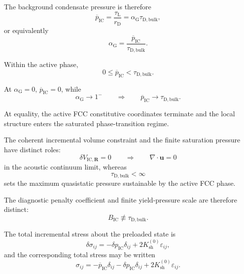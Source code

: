 The background condensate pressure is therefore
\begin{equation}
    \overline{p}_{\mathrm{IC}}
    =
    \frac{\tau_{\mathrm{L}}}{r_{\mathrm{D}}}
    =
    \alpha_{\mathrm{G}}
    \tau_{\mathrm{D,bulk}},
\end{equation}
or equivalently
\begin{equation}
    \alpha_{\mathrm{G}}
    =
    \frac{\overline{p}_{\mathrm{IC}}}
    {\tau_{\mathrm{D,bulk}}}.
\end{equation}

Within the active phase,
\begin{equation}
    0
    \leq
    \overline{p}_{\mathrm{IC}}
    <
    \tau_{\mathrm{D,bulk}}.
\end{equation}

At $\alpha_{\mathrm{G}}=0$,
$\overline{p}_{\mathrm{IC}}=0$, while
\begin{equation}
    \alpha_{\mathrm{G}}
    \rightarrow
    1^{-}
    \qquad
    \Longrightarrow
    \qquad
    \overline{p}_{\mathrm{IC}}
    \rightarrow
    \tau_{\mathrm{D,bulk}}.
\end{equation}

At equality, the active FCC constitutive coordinates terminate and the local structure enters the saturated phase-transition regime.

The coherent incremental volume constraint and the finite saturation pressure have distinct roles:
\begin{equation}
    \delta V_{\mathrm{IC},\mathbf{R}}
    =
    0
    \qquad
    \Longrightarrow
    \qquad
    \nabla\cdot\mathbf{u}
    =
    0
\end{equation}
in the acoustic continuum limit, whereas
\begin{equation}
    \tau_{\mathrm{D,bulk}}
    <
    \infty
\end{equation}
sets the maximum quasistatic pressure sustainable by the active FCC phase.

The diagnostic penalty coefficient and finite yield-pressure scale are therefore distinct:
\begin{equation}
    B_{\mathrm{IC}}
    \not\equiv
    \tau_{\mathrm{D,bulk}}.
\end{equation}

The total incremental stress about the preloaded state is
\begin{equation}
    \delta\sigma_{ij}
    =
    -\delta p_{\mathrm{IC}}\delta_{ij}
    +
    2K_{\mathrm{sh}}^{(0)}
    \varepsilon_{ij},
\end{equation}
and the corresponding total stress may be written
\begin{equation}
    \sigma_{ij}
    =
    -\overline{p}_{\mathrm{IC}}\delta_{ij}
    -
    \delta p_{\mathrm{IC}}\delta_{ij}
    +
    2K_{\mathrm{sh}}^{(0)}
    \varepsilon_{ij}.
\end{equation}

